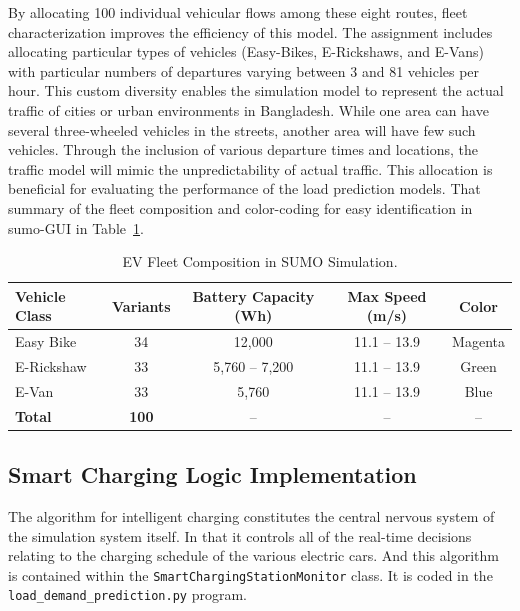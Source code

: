 \documentclass{thesis-library}
\begin{document}
By allocating 100 individual vehicular flows among these eight routes, fleet characterization improves the efficiency of this model. The assignment includes allocating particular types of vehicles (Easy-Bikes, E-Rickshaws, and E-Vans) with particular numbers of departures varying between 3 and 81 vehicles per hour. This custom diversity enables the simulation model to represent the actual traffic of cities or urban environments in Bangladesh. While one area can have several three-wheeled vehicles in the streets, another area will have few such vehicles. Through the inclusion of various departure times and locations, the traffic model will mimic the unpredictability of actual traffic. This allocation is beneficial for evaluating the performance of the load prediction models. That summary of the fleet composition and color-coding for easy identification in \Gls{sumo}-GUI in Table~\ref{tab:fleet_summary}.

\begin{table}[H]
\caption{EV Fleet Composition in SUMO Simulation.}
\label{tab:fleet_summary}
\begin{center}
\begin{small}
\begin{tabular}{lcccc}
\toprule
\textbf{Vehicle Class} & \textbf{Variants} & \textbf{Battery Capacity (Wh)} & \textbf{Max Speed (m/s)} & \textbf{Color} \\
\midrule
Easy Bike  & 34  & 12,000         & 11.1 -- 13.9 & Magenta \\
E-Rickshaw & 33  & 5,760 -- 7,200 & 11.1 -- 13.9 & Green \\
E-Van      & 33  & 5,760          & 11.1 -- 13.9 & Blue \\
\midrule
\textbf{Total} & \textbf{100} & -- & -- & -- \\
\bottomrule
\end{tabular}
\end{small}
\end{center}
\end{table}

\subsection{Smart Charging Logic Implementation}

The algorithm for intelligent charging constitutes the central nervous system of the simulation system itself. In that it controls all of the real-time decisions relating to the charging schedule of the various electric cars. And this algorithm is contained within the \texttt{Smart\-Charging\-Station\-Monitor} class. It is coded in the \texttt{load\_demand\_prediction.py} program.
\end{document}
